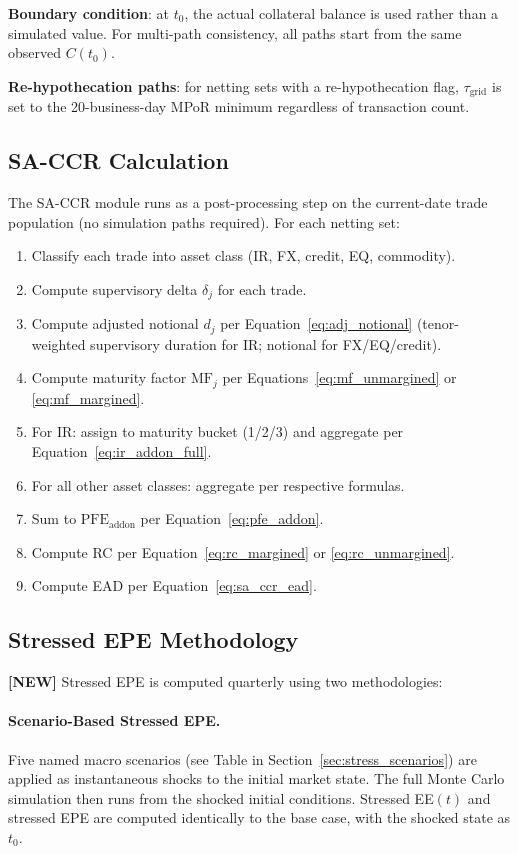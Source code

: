 \documentclass[11pt,a4paper]{article}
\begin{document}
\textbf{Boundary condition}: at $t_0$, the actual collateral balance is used
rather than a simulated value. For multi-path consistency, all paths start from
the same observed $C(t_0)$.

\textbf{Re-hypothecation paths}: for netting sets with a re-hypothecation flag,
$\tau_{\text{grid}}$ is set to the 20-business-day MPoR minimum regardless of
transaction count.

\subsection{SA-CCR Calculation}

The SA-CCR module runs as a post-processing step on the current-date trade
population (no simulation paths required). For each netting set:

\begin{enumerate}[noitemsep]
  \item Classify each trade into asset class (IR, FX, credit, EQ, commodity).
  \item Compute supervisory delta $\delta_j$ for each trade.
  \item Compute adjusted notional $d_j$ per Equation~\eqref{eq:adj_notional}
        (tenor-weighted supervisory duration for IR; notional for FX/EQ/credit).
  \item Compute maturity factor $\text{MF}_j$ per
        Equations~\eqref{eq:mf_unmargined} or \eqref{eq:mf_margined}.
  \item For IR: assign to maturity bucket (1/2/3) and aggregate per
        Equation~\eqref{eq:ir_addon_full}.
  \item For all other asset classes: aggregate per respective formulas.
  \item Sum to $\text{PFE}_{\text{addon}}$ per Equation~\eqref{eq:pfe_addon}.
  \item Compute RC per Equation~\eqref{eq:rc_margined} or \eqref{eq:rc_unmargined}.
  \item Compute EAD per Equation~\eqref{eq:sa_ccr_ead}.
\end{enumerate}

\subsection{Stressed EPE Methodology}
\label{sec:stressed_epe}

\textbf{[NEW]} Stressed EPE is computed quarterly using two methodologies:

\paragraph{Scenario-Based Stressed EPE.}
Five named macro scenarios (see Table in Section~\ref{sec:stress_scenarios})
are applied as instantaneous shocks to the initial market state. The full
Monte Carlo simulation then runs from the shocked initial conditions.
Stressed EE$(t)$ and stressed EPE are computed identically to the base case,
with the shocked state as $t_0$.
\end{document}
